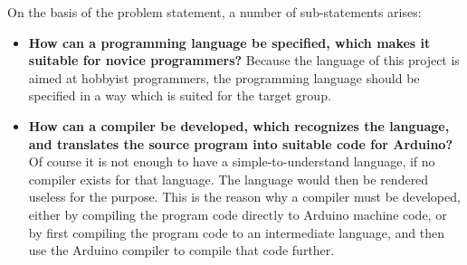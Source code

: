 On the basis of the problem statement, a number of sub-statements arises:
\begin{itemize}
	\item \textbf{How can a programming language be specified, which makes it suitable for novice programmers?} 
	Because the language of this project is aimed at hobbyist programmers, the programming language should be specified in a way which is suited for the target group.
	\item \textbf{How can a compiler be developed, which recognizes the language, and translates the source program into suitable code for Arduino?}
	Of course it is not enough to have a simple-to-understand language, if no compiler exists for that language. The language would then be rendered useless for the purpose. This is the reason why a compiler must be developed, either by compiling the program code directly to Arduino machine code, or by first compiling the program code to an intermediate language, and then use the Arduino compiler to compile that code further. 
\end{itemize}